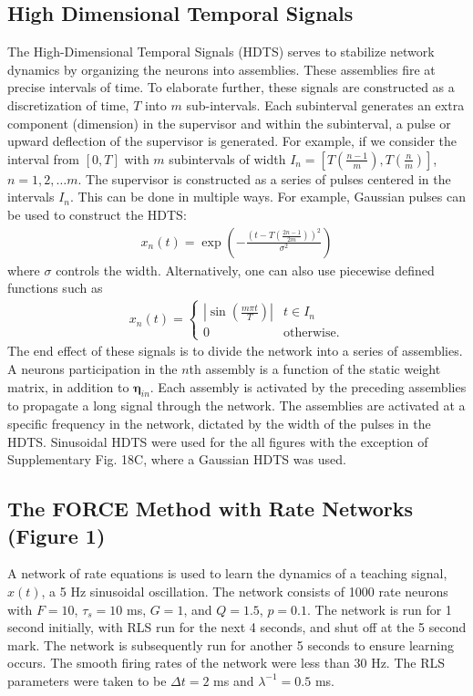\documentclass[11pt]{article} %
\begin{document}
\subsection*{High Dimensional Temporal Signals} 

The High-Dimensional Temporal Signals (HDTS) serves to stabilize 
network dynamics by organizing the neurons into assemblies.  
These assemblies fire at precise intervals of time.   
To elaborate further, these signals are constructed as a 
discretization of time, $T$ into $m$ sub-intervals.   
Each subinterval generates an extra component (dimension) in the supervisor 
and within the subinterval, a pulse or upward deflection of the 
supervisor is generated.  For example, if we consider the interval 
from $[0,T]$ with $m$ subintervals of width 
$I_n = [T\left(\frac{n-1}{m}\right),T\left(\frac{n}{m}\right)]$, $n=1,2,\ldots m$.  
The supervisor is constructed as a series of pulses centered in the intervals $I_n$.  
This can be done in multiple ways.  For example, Gaussian pulses 
can be used to construct the HDTS:
\begin{eqnarray}
x_n(t) = \exp\left(-\frac{\left(t - T\left(\frac{2n-1}{2m} \right)\right)^2}{\sigma^2} \right)
\end{eqnarray}
where $\sigma$ controls the width.  Alternatively, 
one can also use piecewise defined functions such as
\begin{eqnarray}
x_n(t) = \begin{cases} |\sin(\frac{m\pi t}{T})| & t\in I_n\\ 0 & \text{otherwise}. \end{cases}
\end{eqnarray}
The end effect of these signals is to divide the network into a series of assemblies.  
A neurons participation in the $n$th assembly is a function of the static weight matrix, 
in addition to $\bm \eta_{in}$.  Each assembly is activated by the preceding assemblies 
to propagate a long signal through the network.  The assemblies are activated at a specific 
frequency in the network, dictated by the width of the pulses in the HDTS.  
Sinusoidal HDTS were used for the all figures with the exception of Supplementary 
Fig. 18C, where a Gaussian HDTS was used.    



\subsection*{The FORCE Method with Rate Networks (Figure 1) }
A network of rate equations is used to learn the dynamics of a teaching signal, $x(t)$, 
a 5 Hz sinusoidal oscillation.  The network consists of 1000 rate neurons with $F = 10$, 
$\tau_s = 10$ ms, $G=1$, and $Q=1.5$, $p=0.1$.    
The network is run for 1 second initially, with RLS run for the next 4 seconds, 
and shut off at the 5 second mark.  The network is subsequently run for another 5 seconds 
to ensure learning occurs.   The smooth firing rates of the network were less than 30 Hz.  
The RLS parameters were taken to be $\Delta t = 2$ ms and $\lambda^{-1} =  0.5$ ms.  
\end{document}
